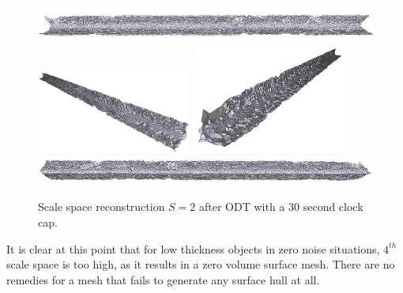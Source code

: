 \documentclass[12pt]{drexelthesis}
\begin{document}
\begin{figure}[!ht]
	\centering
		\includegraphics[width=5in]{simulated-lab-scan/0noise/optimizedNeat/scalespace2odt00.png}
		\includegraphics[width=2in]{simulated-lab-scan/0noise/optimizedNeat/scalespace2odt01.png}
		\includegraphics[width=2in]{simulated-lab-scan/0noise/optimizedNeat/scalespace2odt02.png}
		\includegraphics[width=5in]{simulated-lab-scan/0noise/optimizedNeat/scalespace2odt03.png}
		\caption[Scale space reconstruction $S = 2$ after ODT with a 30 second clock cap]{\centering Scale space reconstruction $S = 2$ after ODT with a 30 second clock cap.}
	\label{zeronoise:scalespace2odt}
\end{figure}

It is clear at this point that for low thickness objects in zero noise situations, $4^{th}$ scale space is too high, as it results in a zero volume surface mesh. There are no remedies for a mesh that fails to generate any surface hull at all.
\end{document}
